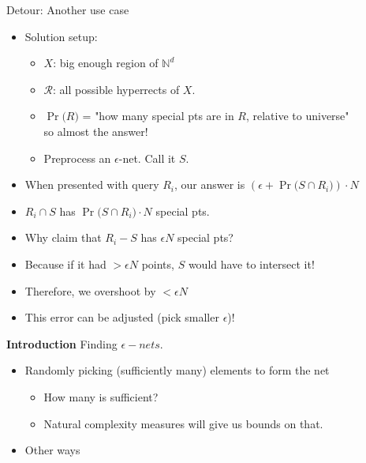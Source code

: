\documentclass{beamer}
\begin{document}
\begin{frame}{Detour: Another use case}
  \begin{itemize}
    \item Solution setup:
    \begin{itemize} 
        \item \(X\): \hspace{0.9cm} big enough region of $\mathbb{N}^d$
        \item \(\mathcal{R}\): \hspace{0.9cm} all possible hyperrects of \(X\).
    \item \( \Pr \bigl(R \bigr)\) = "how many special pts are in \(R\), relative to universe" \\ so almost the answer!
      \item Preprocess an $\epsilon$-net. Call it \(S\).
    
    \end{itemize}
    
    \item When presented with query \(R_i\), our answer is  \( (\epsilon + \Pr \bigl(S \cap R_i \bigr)) \cdot N \)
    \vspace{0.2cm}
    \item $R_i \cap S$ has \( \Pr \bigl(S \cap R_i \bigr) \cdot N \) special pts. 
    \vspace{0.2cm}
    \item Why claim that $R_i - S$ has $\epsilon N$ special pts? 
    \vspace{0.2cm}
    \item Because if it had $>\epsilon N$ points, $S$ would have to intersect it!
    \vspace{0.2cm}
    \item Therefore, we overshoot by $<\epsilon N$ 
    \vspace{0.2cm}
    \item This error can be adjusted (pick smaller $\epsilon$)!
    

  \end{itemize}
\end{frame}

\begin{frame}{\textbf{Introduction}}
    Finding \(\epsilon-nets\).
    \begin{itemize}
        \item Randomly picking (sufficiently many) elements to form the net
        \begin{itemize}
            \item How many is sufficient? 
            \item Natural complexity measures will give us bounds on that.
        \end{itemize}
        \vspace{0.2cm}
        \item Other ways
    \end{itemize}
\end{frame}
\end{document}
